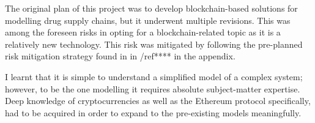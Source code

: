 The original plan of this project was to develop blockchain-based solutions for modelling drug supply chains, but it underwent multiple revisions. This was among the foreseen risks in opting for a blockchain-related topic as it is a relatively new technology. This risk was mitigated by following the pre-planned risk mitigation strategy found in in /ref**** in the appendix.

I learnt that it is simple to understand a simplified model of a complex system; however, to be the one modelling it requires absolute subject-matter expertise. Deep knowledge of cryptocurrencies as well as the Ethereum protocol specifically, had to be acquired in order to expand to the pre-existing models meaningfully. 